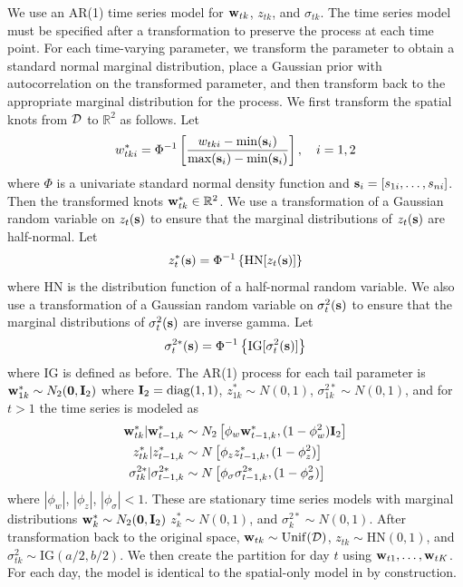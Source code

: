 We use an AR(1) time series model for $\mathbf{w}_{tk}$, $z_{tk}$, and $\sigma_{tk}$.
The time series model must be specified after a transformation to preserve the \skewt{} process at each time point.
For each time-varying parameter, we transform the parameter to obtain a standard normal marginal distribution, place a Gaussian prior with autocorrelation on the transformed parameter, and then transform back to the appropriate marginal distribution for the \skewt{} process.
We first transform the spatial knots from ${\cal D}$ to $\mathbb{R}^2$ as follows.
Let
\begin{align} \label{steq:wstar}
  w^*_{tki} = \Phi^{-1}\left[ \frac{ w_{tki} - \min(\mathbf{s}_i)}{ \max(\mathbf{s}_i) - \min(\mathbf{s}_i) } \right], \quad i = 1, 2
\end{align}
where $\Phi$ is a univariate standard normal density function and $\mathbf{s}_i = [s_{1i}, \ldots, s_{ni}]$.
Then the transformed knots $\mathbf{w}^*_{tk} \in \mathbb{R}^2$.
We use a transformation of a Gaussian random variable on $z_{t}(\mathbf{s})$ to ensure that the marginal distributions of $z_t(\mathbf{s})$ are half-normal.
Let
\begin{align} \label{steq:zstar}
  z^*_t(\mathbf{s}) = \Phi^{-1}\left\{ \text{HN}[z_t(\mathbf{s})] \right\}
\end{align}
where HN is the distribution function of a half-normal random variable.
We also use a transformation of a Gaussian random variable on $\sigma^2_t(\mathbf{s})$ to ensure that the marginal distributions of $\sigma^2_t(\mathbf{s})$ are inverse gamma.
Let
\begin{align} \label{steq:sigmastar}
  \sigma^{2*}_t(\mathbf{s}) =\Phi^{-1}\left\{ \text{IG}[\sigma^2_t(\mathbf{s})] \right\}
\end{align}
where IG is defined as before.
The AR(1) process for each tail parameter is $\mathbf{w}^*_{1k} \sim N_2(\mathbf{0}, \mathbf{I}_2)$ where $\mathbf{I}_2 = \text{diag}(1, 1)$, $z^*_{1k} \sim N(0, 1)$, $\sigma^{2*}_{1k} \sim N(0, 1)$, and for $t > 1$ the time series is modeled as
\begin{align}
  \mathbf{w}^*_{tk} | \mathbf{w}^*_{t-1, k} &\sim N_2\left[\phi_w \mathbf{w}^*_{t-1, k}, (1 - \phi_w^2) \mathbf{I}_2 \right] \label{steq:ts-wstar}\\
  z^*_{tk} | z^*_{t-1, k} &\sim N \left[\phi_z z^*_{t-1, k}, (1 - \phi_z^2)\right] \label{steq:ts-zstar} \\
  \sigma^{2*}_{tk} | \sigma^{2*}_{t-1, k} &\sim N \left[\phi_\sigma \sigma^{2*}_{t-1, k}, (1 - \phi_\sigma^2) \right] \label{steq:ts-sigmastar}
\end{align}
where $|\phi_w|$, $|\phi_z|$, $|\phi_\sigma| < 1$.
These are stationary time series models with marginal distributions \hbox{$\mathbf{w}^*_{k} \sim N_2(\mathbf{0}, \mathbf{I}_2)$} \hbox{$z^*_{k} \sim N(0, 1)$}, and \hbox{$\sigma^{2*}_{k} \sim N(0, 1)$}.
After transformation back to the original space, $\mathbf{w}_{tk} \sim \mathrm{Unif}({\cal D})$, $z_{tk} \sim \mathrm{HN}(0, 1)$, and $\sigma^2_{tk} \sim \mathrm{IG}(a / 2, b / 2)$.
We then create the partition for day $t$ using $\mathbf{w}_{t1}, \ldots, \mathbf{w}_{tK}$.
For each day, the model is identical to the spatial-only model in  by construction.

